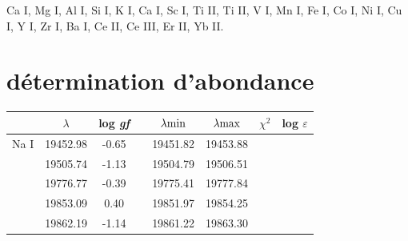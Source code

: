 Ca I, Mg I, Al I, Si I, K I, Ca I, Sc I, Ti II, Ti II, V I, Mn I, Fe I, Co I, Ni I, Cu I,
Y I, Zr I, Ba I, Ce II, Ce III, Er II, Yb II.  

\section{détermination d'abondance}
\begin{table}[h!]
  \vspace{0.3cm}
\begin{center}
	\begin{tabular}{cccccccc}
		\hline
    \hline
        &$\lambda$ & log \textit{gf}&& $\lambda{\rm min}$ & $\lambda{\rm max}$ & $\chi^2$ & log $\varepsilon$ \\
        \hline
        Na I & 19452.98& -0.65 && 19451.82 & 19453.88 & & \\
        & 19505.74& -1.13 && 19504.79 & 19506.51 & & \\
        & 19776.77& -0.39 && 19775.41 & 19777.84 & & \\
        & 19853.09& 0.40 && 19851.97 & 19854.25 & & \\
        & 19862.19& -1.14 && 19861.22 & 19863.30 & & \\
        \hline

\end{tabular}
\end{center}
\end{table}

